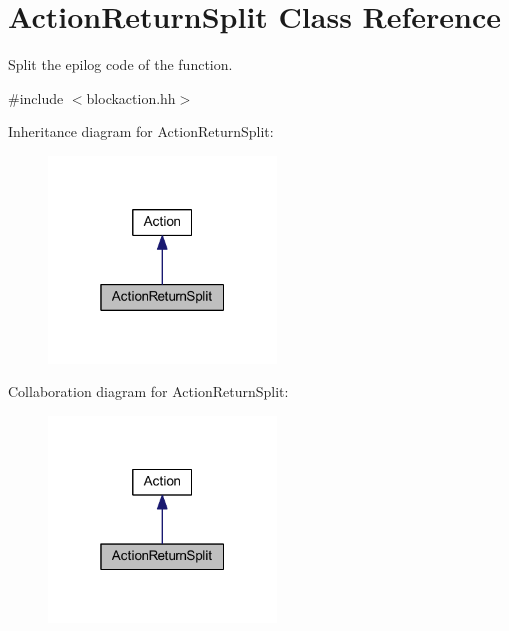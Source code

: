 \hypertarget{class_action_return_split}{}\section{Action\+Return\+Split Class Reference}
\label{class_action_return_split}


Split the epilog code of the function.  




{\ttfamily \#include $<$blockaction.\+hh$>$}



Inheritance diagram for Action\+Return\+Split\+:
\nopagebreak
\begin{figure}[H]
\begin{center}
\leavevmode
\includegraphics[width=172pt]{class_action_return_split__inherit__graph}
\end{center}
\end{figure}


Collaboration diagram for Action\+Return\+Split\+:
\nopagebreak
\begin{figure}[H]
\begin{center}
\leavevmode
\includegraphics[width=172pt]{class_action_return_split__coll__graph}
\end{center}
\end{figure}
